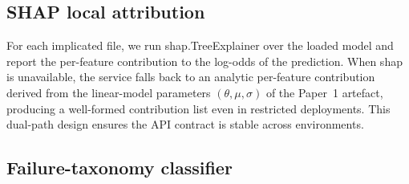 \documentclass[conference]{IEEEtran}
\begin{document}
\subsection{SHAP local attribution}

For each implicated file, we run shap.TreeExplainer over the loaded model and report the per-feature contribution to the log-odds of the prediction. When shap is unavailable, the service falls back to an analytic per-feature contribution derived from the linear-model parameters $(\theta, \mu, \sigma)$ of the Paper~1 artefact, producing a well-formed contribution list even in restricted deployments. This dual-path design ensures the API contract is stable across environments.

\subsection{Failure-taxonomy classifier}
\end{document}
